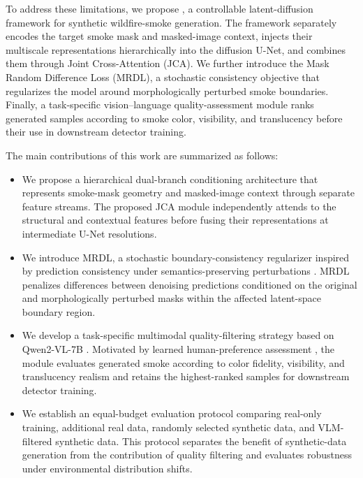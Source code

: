 \documentclass[journal]{IEEEtran}
\begin{document}
To address these limitations, we propose \method, a controllable
latent-diffusion framework for synthetic wildfire-smoke generation.
The framework separately encodes the target smoke mask and masked-image
context, injects their multiscale representations hierarchically into
the diffusion U-Net, and combines them through Joint Cross-Attention
(JCA). We further introduce the Mask Random Difference Loss (MRDL), a
stochastic consistency objective that regularizes the model around
morphologically perturbed smoke boundaries. Finally, a task-specific
vision--language quality-assessment module ranks generated samples
according to smoke color, visibility, and translucency before their use
in downstream detector training.

The main contributions of this work are summarized as follows:

\begin{itemize}
    \item We propose a hierarchical dual-branch conditioning
    architecture that represents smoke-mask geometry and masked-image
    context through separate feature streams. The proposed JCA module
    independently attends to the structural and contextual features
    before fusing their representations at intermediate U-Net
    resolutions.

    \item We introduce MRDL, a stochastic boundary-consistency
    regularizer inspired by prediction consistency under
    semantics-preserving perturbations
    \cite{sajjadi2016regularizationstochastictransformationsperturbations}.
    MRDL penalizes differences between denoising predictions conditioned
    on the original and morphologically perturbed masks within the
    affected latent-space boundary region.

    \item We develop a task-specific multimodal quality-filtering
    strategy based on Qwen2-VL-7B
    \cite{wang2024qwen2vlenhancingvisionlanguagemodels}. Motivated by
    learned human-preference assessment
    \cite{xu2023imagerewardlearningevaluatinghuman,
    wu2023humanpreferencescorebetter}, the module evaluates generated
    smoke according to color fidelity, visibility, and translucency
    realism and retains the highest-ranked samples for downstream
    detector training.

    \item We establish an equal-budget evaluation protocol comparing
    real-only training, additional real data, randomly selected
    synthetic data, and VLM-filtered synthetic data. This protocol
    separates the benefit of synthetic-data generation from the
    contribution of quality filtering and evaluates robustness under
    environmental distribution shifts.
\end{itemize}
\end{document}
